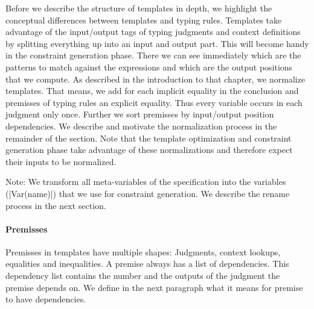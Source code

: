 Before we describe the structure of templates in depth, we highlight
the conceptual differences between templates and typing rules.
Templates take advantage of the input/output tags of typing judgments
and context definitions by splitting everything up into an input and
output part. This will become handy in the constraint generation
phase. There we can see immediately which are the patterns to match
against the expressions and which are the output positions that we
compute. As described in the introduction to that chapter, we
normalize templates. That means, we add for each implicit equality in
the conclusion and premisses of typing rules an explicit
equality. Thus every variable occurs in each judgment only
once. Further we sort premisses by input/output position
dependencies. We describe and motivate the normalization process in
the remainder of the section. Note that the template optimization and
constraint generation phase take advantage of these normalizations and
therefore expect their inputs to be normalized.

Note: We transform all meta-variables of the specification into the
variables (\code|Var(name)|) that we use for constraint
generation. We describe the rename process in the next section.

\paragraph*{Premisses}
Premisses in templates have multiple shapes: Judgments, context
lookups, equalities and inequalities. A premise always has a list of
dependencies. This dependency list contains the number and the outputs
of the judgment the premise depends on. We define in the next
paragraph what it means for premise to have dependencies.


